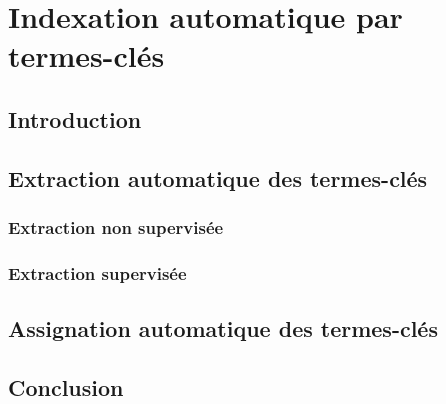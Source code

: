 
  \chapter{Indexation automatique par termes-clés}
  \label{chap:main-state_of_the_art-automatic_keyphrase_extraction}
    \section{Introduction}
    \label{sec:main-state_of_the_art-automatic_keyphrase_extraction-introduction}

    \section{Extraction automatique des termes-clés }
    \label{sec:main-state_of_the_art-automatic_keyphrase_extraction-automatic_keyphrase_extraction}
      \subsection{Extraction non supervisée}
      \label{subsec:main-state_of_the_art-automatic_keyphrase_extraction-automatic_keyphrase_extraction-unsupervised_keyphrase_extraction}

      \subsection{Extraction supervisée}
      \label{subsec:main-state_of_the_art-automatic_keyphrase_extraction-automatic_keyphrase_extraction-supervised_keyphrase_extraction}

    \section{Assignation automatique des termes-clés}
    \label{sec:main-state_of_the_art-automatic_keyphrase_extraction-automatic_keyphrase_assignment}

    \section{Conclusion}
    \label{sec:main-state_of_the_art-automatic_keyphrase_extraction-conclusion}


